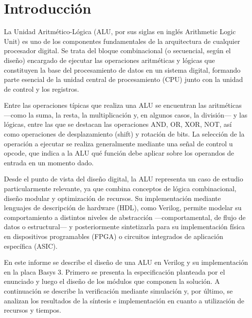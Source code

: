 \section{Introducción}
La Unidad Aritmético-Lógica (ALU, por sus siglas en inglés Arithmetic Logic Unit) es uno de los componentes fundamentales de la arquitectura de cualquier procesador digital. Se trata del bloque combinacional (o secuencial, según el diseño) encargado de ejecutar las operaciones aritméticas y lógicas que constituyen la base del procesamiento de datos en un sistema digital, formando parte esencial de la unidad central de procesamiento (CPU) junto con la unidad de control y los registros.

Entre las operaciones típicas que realiza una ALU se encuentran las aritméticas —como la suma, la resta, la multiplicación y, en algunos casos, la división— y las lógicas, entre las que se destacan las operaciones AND, OR, XOR, NOT, así como operaciones de desplazamiento (shift) y rotación de bits. La selección de la operación a ejecutar se realiza generalmente mediante una señal de control u opcode, que indica a la ALU qué función debe aplicar sobre los operandos de entrada en un momento dado.

Desde el punto de vista del diseño digital, la ALU representa un caso de estudio particularmente relevante, ya que combina conceptos de lógica combinacional, diseño modular y optimización de recursos. Su implementación mediante lenguajes de descripción de hardware (HDL), como Verilog, permite modelar su comportamiento a distintos niveles de abstracción —comportamental, de flujo de datos o estructural— y posteriormente sintetizarla para su implementación física en dispositivos programables (FPGA) o circuitos integrados de aplicación específica (ASIC).

En este informe se describe el diseño de una ALU en Verilog y su implementación en la placa Basys 3. Primero se presenta la especificación planteada por el enunciado y luego el diseño de los módulos que componen la solución. A continuación se describe la verificación mediante simulación y, por último, se analizan los resultados de la síntesis e implementación en cuanto a utilización de recursos y tiempos.
